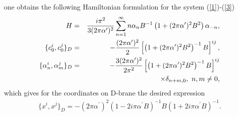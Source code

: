 \documentclass[a4paper]{article}
\begin{document}
one obtains the following Hamiltonian formulation for the system 
(\ref{1})-(\ref{3})
\begin{eqnarray}\label{27}
H&=&\frac{i\pi^2}{3(2\pi\alpha^\prime)^2}\sum_{n=1}^\infty
n\alpha_nB^{-1}\left(1+(2\pi\alpha^\prime)^2B^2\right)\alpha_{-n}, \nonumber \cr
\{c_0^i, c_0^j\}_D&=&-\frac{(2\pi\alpha^\prime)^2}{2}  
\left[\left(1+(2\pi\alpha^\prime)^2B^2\right)^{-1}B\right]^{ij}, \nonumber \cr
\{\alpha_n^i, \alpha_m^j\}_D&=&-\frac{3(2\pi\alpha^\prime)^2}{2\pi^2}
\left[\left(1+(2\pi\alpha^\prime)^2B^2\right)^{-1}B\right]^{ij}\nonumber \\
&&\times \delta_{n+m,0}, ~ n, m\ne 0,
\end{eqnarray}
which gives for the coordinates on D-brane the desired expression 
\begin{eqnarray}\label{28}
\{x^i, x^j\}_D=-(2\pi\alpha^\prime)^2(1-2i\pi\alpha^\prime B)^{-1}
B(1+2i\pi\alpha^\prime B)^{-1}.
\end{eqnarray}
%
%
%   
\end{document}

